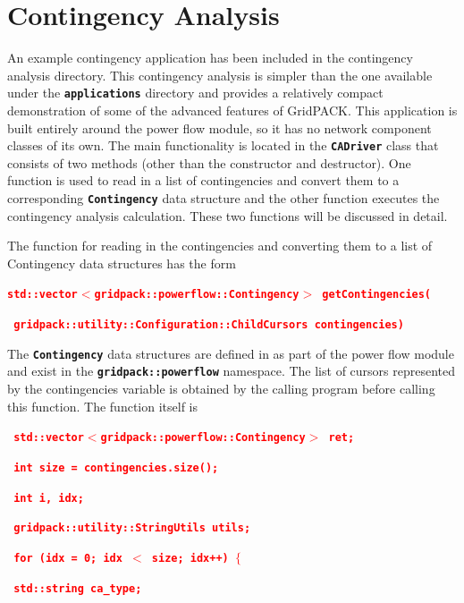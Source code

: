 \documentclass[12pt]{report} %
\begin{document}
\section{Contingency Analysis}

An example contingency application has been included in the contingency analysis directory. This contingency analysis is simpler than the one available under the \texttt{\textbf{applications}} directory and provides a relatively compact demonstration of some of the advanced features of GridPACK. This application is built entirely around the power flow module, so it has no network component classes of its own. The main functionality is located in the \texttt{\textbf{CADriver}} class that consists of two methods (other than the constructor and destructor). One function is used to read in a list of contingencies and convert them to a corresponding \texttt{\textbf{Contingency}} data structure and the other function executes the contingency analysis calculation. These two functions will be discussed in detail.

The function for reading in the contingencies and converting them to a list of Contingency data structures has the form

\textcolor{red}{\texttt{\textbf{std::vector$\boldsymbol{\mathrm{<}}$gridpack::powerflow::Contingency$\boldsymbol{\mathrm{>}}$ getContingencies(}}}

\textcolor{red}{\texttt{\textbf{  gridpack::utility::Configuration::ChildCursors contingencies)}}}

The \texttt{\textbf{Contingency}} data structures are defined in as part of the power flow module and exist in the \texttt{\textbf{gridpack::powerflow}} namespace. The list of cursors represented by the contingencies variable is obtained by the calling program before calling this function. The function itself is

\textcolor{red}{\texttt{\textbf{  std::vector$\boldsymbol{\mathrm{<}}$gridpack::powerflow::Contingency$\boldsymbol{\mathrm{>}}$ ret;}}}

\textcolor{red}{\texttt{\textbf{  int size = contingencies.size();}}}

\textcolor{red}{\texttt{\textbf{  int i, idx;}}}

\textcolor{red}{\texttt{\textbf{  gridpack::utility::StringUtils utils;}}}

\textcolor{red}{\texttt{\textbf{  for (idx = 0; idx $\boldsymbol{\mathrm{<}}$ size; idx++) $\boldsymbol{\mathrm{\{}}$}}}

\textcolor{red}{\texttt{\textbf{    std::string ca\_type;}}}
\end{document}
